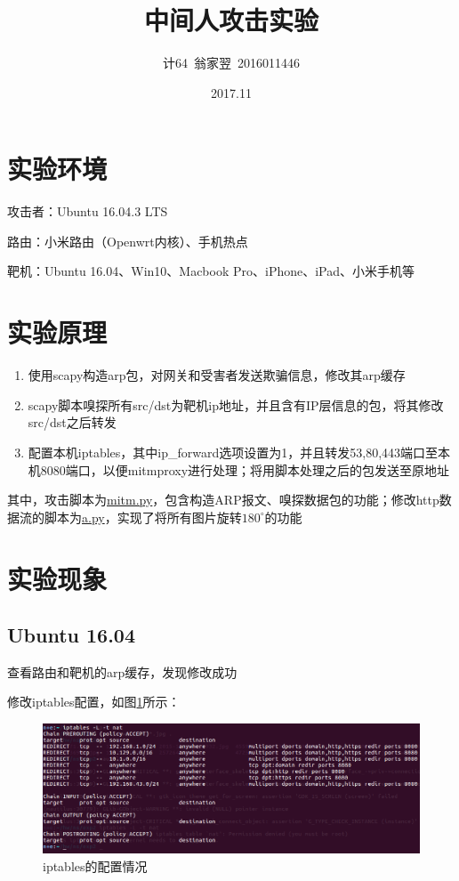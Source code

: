 \documentclass[a4paper]{article}
\title{\bf 中间人攻击实验}
\date{2017.11}
\author{计64~翁家翌~2016011446}
\begin{document}
\kaishu
\ttfamily
\maketitle
\section{实验环境}
攻击者：Ubuntu 16.04.3 LTS

路由：小米路由（Openwrt内核）、手机热点

靶机：Ubuntu 16.04、Win10、Macbook Pro、iPhone、iPad、小米手机等
\section{实验原理}
\begin{enumerate}
	\item 使用scapy构造arp包，对网关和受害者发送欺骗信息，修改其arp缓存
	\item scapy脚本嗅探所有src/dst为靶机ip地址，并且含有IP层信息的包，将其修改src/dst之后转发
	\item 配置本机iptables，其中ip\_forward选项设置为1，并且转发53,80,443端口至本机8080端口，以便mitmproxy进行处理；将用脚本处理之后的包发送至原地址
\end{enumerate}

其中，攻击脚本为\uline{mitm.py}，包含构造ARP报文、嗅探数据包的功能；修改http数据流的脚本为\uline{a.py}，实现了将所有图片旋转$180^\circ$的功能
\section{实验现象}
\subsection{Ubuntu 16.04}
查看路由和靶机的arp缓存，发现修改成功

修改iptables配置，如图\ref{fig:iptables}所示：
\begin{figure}[htp]
\centering
\includegraphics[width=0.89\linewidth]{iptables.png}
\caption{iptables的配置情况}
\label{fig:iptables}
\end{figure}
\end{document}
